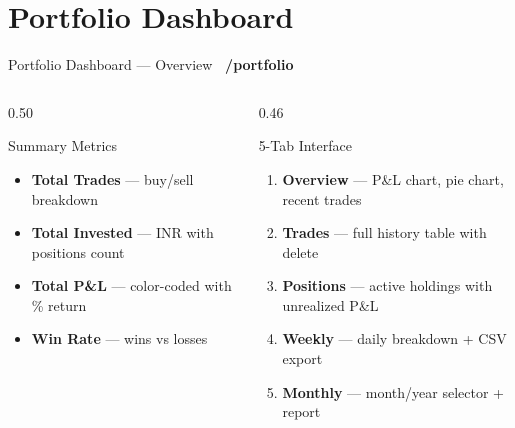 \documentclass[aspectratio=169, 11pt]{beamer}
\newcommand{\tagbox}[2]{\colorbox{#1}{\scriptsize\color{white}\textbf{~#2~}}}
\begin{document}
\section{Portfolio Dashboard}
\begin{frame}{Portfolio Dashboard — Overview \hfill \tagbox{accentamber}{/portfolio}}
\begin{columns}[T]
\begin{column}{0.50\textwidth}
\begin{block}{Summary Metrics}
\begin{itemize}
  \item \textbf{Total Trades} — buy/sell breakdown
  \item \textbf{Total Invested} — INR with positions count
  \item \textbf{Total P\&L} — color-coded with \% return
  \item \textbf{Win Rate} — wins vs losses
\end{itemize}
\end{block}
\end{column}
\begin{column}{0.46\textwidth}
\begin{block}{5-Tab Interface}
\begin{enumerate}
  \item \textbf{Overview} — P\&L chart, pie chart, recent trades
  \item \textbf{Trades} — full history table with delete
  \item \textbf{Positions} — active holdings with unrealized P\&L
  \item \textbf{Weekly} — daily breakdown + CSV export
  \item \textbf{Monthly} — month/year selector + report
\end{enumerate}
\end{block}
\end{column}
\end{columns}
\end{frame}
\end{document}
